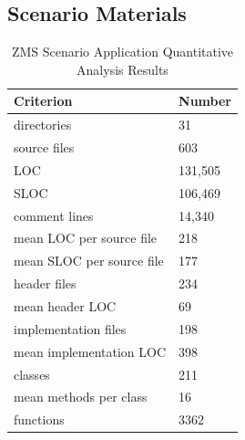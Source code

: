\begin{appendix}

\chapter{Scenario Materials}
\hypertarget{tbl:zms-analysis}{}
\begin{table}[h]
  \caption{ZMS Scenario Application Quantitative Analysis Results}
  \label{tbl:zms-analysis}
  \centering
    \begin{tabularx}{0.98\linewidth}{ XX } 
    \toprule
    \textbf{Criterion} & \textbf{Number} \\
    \midrule
    directories & 31\\
    source files & 603\\
    LOC & 131,505\\
    SLOC & 106,469\\
    comment lines & 14,340\\
    mean LOC per source file & 218\\ 
    mean SLOC per source file & 177\\
    header files & 234\\
    mean header LOC & 69\\
    implementation files & 198\\
    mean implementation LOC & 398\\
    classes & 211\\
    mean methods per class & 16\\
    functions & 3362\\
    \bottomrule
    \end{tabularx}
\end{table}


\end{appendix}
